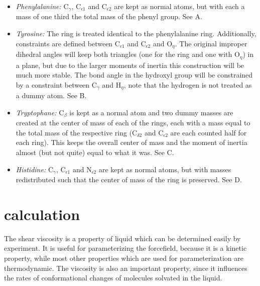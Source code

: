 \begin{itemize}

\item{\em Phenylalanine:\/} {\sf C}$_\gamma$, {\sf C}$_{{\epsilon}1}$
and {\sf C}$_{{\epsilon}2}$ are kept as normal atoms, but with each a
mass of one third the total mass of the phenyl group. See
A.

\item{\em Tyrosine:\/} The ring is treated identical to the
phenylalanine ring. Additionally, constraints are defined between {\sf
C}$_{{\epsilon}1}$ and {\sf C}$_{{\epsilon}2}$ and {\sf O}$_{\eta}$.
The original improper dihedral angles will keep both triangles (one
for the ring and one with {\sf O}$_{\eta}$) in a plane, but due to the
larger moments of inertia this construction will be much more
stable. The bond angle in the hydroxyl group will be constrained by a
constraint between {\sf C}$_\gamma$ and {\sf H}$_{\eta}$, note that
the hydrogen is not treated as a dummy atom. See
B.

\item{\em Tryptophane:\/} {\sf C}$_\beta$ is kept as a normal atom
and two dummy masses are created at the center of mass of each of the
rings, each with a mass equal to the total mass of the respective ring
({\sf C}$_{{\delta}2}$ and {\sf C}$_{{\epsilon}2}$ are each
counted half for each ring). This keeps the overall center of mass and
the moment of inertia almost (but not quite) equal to what it was. See
C.

\item{\em Histidine:\/} {\sf C}$_\gamma$, {\sf C}$_{{\epsilon}1}$
and {\sf N}$_{{\epsilon}2}$ are kept as normal atoms, but with masses
redistributed such that the center of mass of the ring is
preserved. See D.

\end{itemize}

\section{ calculation}

The shear viscosity is a property of liquid which can be determined easily  
by experiment. It is useful for parameterizing the forcefield,
because it is a kinetic property, while most other properties
which are used for parameterization are thermodynamic.
The viscosity is also an important property, since it influences
the rates of conformational changes of molecules solvated in the liquid.

